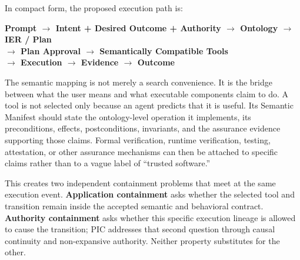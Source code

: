 \documentclass[10pt,oneside,openany]{book}
\newcommand{\term}[1]{\textbf{#1}}
\begin{document}
\begin{center}
{}
\end{center}

In compact form, the proposed execution path is:

\begin{center}
\sffamily\bfseries\footnotesize
Prompt $\rightarrow$ Intent + Desired Outcome + Authority $\rightarrow$ Ontology $\rightarrow$ IER / Plan\\
$\rightarrow$ Plan Approval $\rightarrow$ Semantically Compatible Tools\\
$\rightarrow$ Execution $\rightarrow$ Evidence $\rightarrow$ Outcome
\end{center}

The semantic mapping is not merely a search convenience. It is the bridge between what the user means and what executable components claim to do. A tool is not selected only because an agent predicts that it is useful. Its Semantic Manifest should state the ontology-level operation it implements, its preconditions, effects, postconditions, invariants, and the assurance evidence supporting those claims. Formal verification, runtime verification, testing, attestation, or other assurance mechanisms can then be attached to specific claims rather than to a vague label of ``trusted software.''

This creates two independent containment problems that meet at the same execution event. \term{Application containment} asks whether the selected tool and transition remain inside the accepted semantic and behavioral contract. \term{Authority containment} asks whether this specific execution lineage is allowed to cause the transition; PIC addresses that second question through causal continuity and non-expansive authority. Neither property substitutes for the other.
\end{document}
